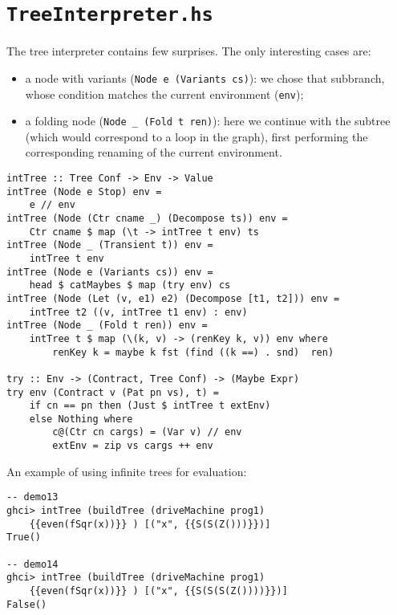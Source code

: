 \section{\texttt{TreeInterpreter.hs}}

The tree interpreter contains few surprises.
The only interesting cases are:
\begin{itemize}
\item a node with variants (\texttt{Node e (Variants cs)}): we chose that
subbranch, whose condition matches the current environment (\texttt{env});
\item a folding node (\texttt{Node \_ (Fold t ren)}): 
here we continue with the subtree (which would correspond to a loop in the graph),
first performing the corresponding renaming of the current environment.
\end{itemize}

\begin{lstlisting}[name=treeinterpreter]
intTree :: Tree Conf -> Env -> Value
intTree (Node e Stop) env =
	e // env
intTree (Node (Ctr cname _) (Decompose ts)) env =
	Ctr cname $ map (\t -> intTree t env) ts
intTree (Node _ (Transient t)) env =
	intTree t env
intTree (Node e (Variants cs)) env =
	head $ catMaybes $ map (try env) cs
intTree (Node (Let (v, e1) e2) (Decompose [t1, t2])) env =
	intTree t2 ((v, intTree t1 env) : env)
intTree (Node _ (Fold t ren)) env =
	intTree t $ map (\(k, v) -> (renKey k, v)) env where
		renKey k = maybe k fst (find ((k ==) . snd)  ren)

try :: Env -> (Contract, Tree Conf) -> (Maybe Expr)
try env (Contract v (Pat pn vs), t) =
	if cn == pn then (Just $ intTree t extEnv) 
	else Nothing where
		c@(Ctr cn cargs) = (Var v) // env
		extEnv = zip vs cargs ++ env
\end{lstlisting}


An example of using infinite trees for evaluation:
\begin{lstlisting}[style=demo]
-- demo13
ghci> intTree (buildTree (driveMachine prog1) 
	{{even(fSqr(x))}} ) [("x", {{S(S(Z()))}})]
True()

-- demo14
ghci> intTree (buildTree (driveMachine prog1) 
	{{even(fSqr(x))}} ) [("x", {{S(S(S(Z())))}})]
False()
\end{lstlisting}